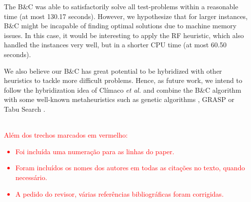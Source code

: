 \documentclass{ro}
\begin{document}


The  B\&C was able to satisfactorily solve all test-problems within a reasonable time (at most 130.17 seconds). However,  we hypothesize that for larger instances, B\&C might  be incapable of finding optimal solutions due to machine memory issues. In this case, it would be interesting to apply the RF heuristic, which also handled the instances very well, but in a shorter CPU time (at most 60.50 seconds).

We also believe our B\&C has great potential to be hybridized with other heuristics to tackle more difficult problems. Hence, as future work, we intend to follow the hybridization idea of Cl\'imaco \textit{et al.}\cite{climaco2018} and combine the B\&C algorithm with some well-known metaheuristics such as genetic algorithms \cite{kramer2017genetic}, GRASP \cite{resende2016optimization} or Tabu Search \cite{laguna2018tabu}.




\textcolor{red}{
\\[1em]
Além dos trechos marcados em vermelho:
\begin{itemize}
    \item Foi incluída uma numeração para as linhas do paper.
    \item Foram incluídos os nomes dos autores em todas as citações no texto, quando necessário. 
    \item A pedido do revisor, várias referências bibliográficas foram corrigidas.
\end{itemize}
}


\end{document}
